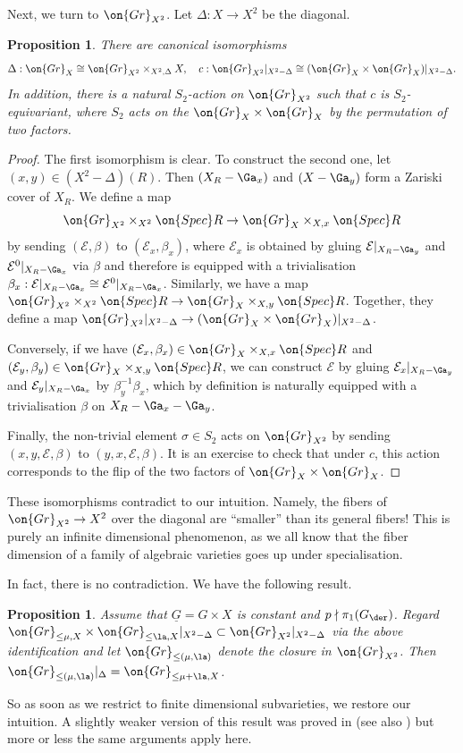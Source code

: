 \documentclass[]{pcmi}
\theoremstyle{plain}
\newtheorem{prop}[equation]{Proposition}
\theoremstyle{remark}
\theoremstyle{definition}
\newcommand{\mE}{{\mathcal E}}
\newcommand{\Gr}{{\on{Gr}}}
\newcommand{\Spec}{\on{Spec}}
\begin{document}
Next, we turn to $\Gr_{X^2}$. Let $\Delta:X\to X^2$ be the diagonal.
\begin{prop}\label{III:Gr2}
There are canonical isomorphisms
\[\Delta:\Gr_X\cong \Gr_{X^2}\times_{X^2,\Delta}X,\quad c:\Gr_{X^2}|_{X^2-\Delta}\cong (\Gr_X\times\Gr_X)|_{X^2-\Delta}.\]
In addition, there is a natural $S_2$-action on $\Gr_{X^2}$ such that $c$ is $S_2$-equivariant, where $S_2$ acts on the $\Gr_X\times\Gr_X$ by the permutation of two factors.
\end{prop}
\begin{proof}The first isomorphism is clear. To construct the second one, let $(x,y)\in (X^2-\Delta)(R)$. Then $(X_R-\Ga_x)$ and $(X-\Ga_y)$ form a Zariski cover of $X_R$. We define a map $$\Gr_{X^2}\times_{X^2}\Spec R\to \Gr_X\times_{X,x}\Spec R$$ by sending $(\mE,\beta)$ to $(\mE_x,\beta_x)$, where $\mE_x$ is obtained by gluing $\mE|_{X_R-\Ga_y}$ and $\mE^0|_{X_R-\Ga_x}$ via $\beta$ and therefore is equipped with a trivialisation $\beta_x: \mE|_{X_R- \Ga_x}\cong \mE^0|_{X_R-\Ga_x}$. Similarly, we have a map $\Gr_{X^2}\times_{X^2}\Spec R\to \Gr_X\times_{X,y}\Spec R$. Together, they define a map $\Gr_{X^2}|_{X^2-\Delta}\to (\Gr_X\times\Gr_X)|_{X^2-\Delta}$.

Conversely, if we have $(\mE_x,\beta_x)\in \Gr_X\times_{X,x}\Spec R$ and $(\mE_y,\beta_y)\in \Gr_X\times_{X,y}\Spec R$, we can construct $\mE$ by gluing $\mE_{x}|_{X_R- \Ga_y}$ and $\mE_y|_{X_R-\Ga_x}$ by $\beta^{-1}_y\beta_x$, which by definition is naturally equipped with a trivialisation $\beta$ on $X_R-\Ga_x-\Ga_y$.

Finally, the non-trivial element $\sigma\in S_2$ acts on $\Gr_{X^2}$ by sending $(x,y, \mE,\beta)$ to $(y,x,\mE,\beta)$. It is an exercise to check that under $c$, this action corresponds to the flip of the two factors of $\Gr_X\times\Gr_X$.
\end{proof}


These isomorphisms contradict to our intuition. Namely, the fibers of $\Gr_{X^2}\to X^2$ over the diagonal are ``smaller'' than its general fibers! This is purely an infinite dimensional phenomenon, as we all know that the fiber dimension of a family of algebraic varieties goes up under specialisation. 

In fact, there is no contradiction. We have the following result.
\begin{prop}\label{III:closure}
Assume that $\underline G=G\times X$ is constant and $p\nmid \pi_1(G_\der)$. Regard $\Gr_{\leq \mu,X}\times \Gr_{\leq \la,X}|_{X^2-\Delta}\subset \Gr_{X^2}|_{X^2-\Delta}$ via the above identification and let $\Gr_{\leq (\mu,\la)}$ denote the closure in $\Gr_{X^2}$. Then $\Gr_{\leq (\mu,\la)}|_{\Delta}= \Gr_{\leq \mu+\la,X}$.
\end{prop}
So as soon as we restrict to finite dimensional subvarieties, we restore our intuition.  A slightly  weaker version of this result was proved in \cite{Z07} (see also \cite{Z10}) but more or less the same arguments apply here.
\end{document}
